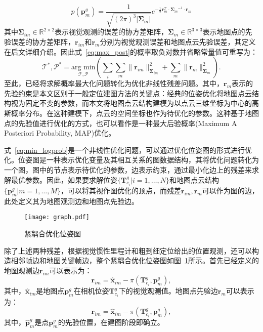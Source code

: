 \begin{equation}
  p(\symbf{p}_m^g) = \frac{1}{\sqrt{(2\pi)^3|\symbf{\Sigma}_m|}}e^{-\frac{1}{2}\symbf{r}_{m}^T \cdot {\symbf{\Sigma}_{m}}^{-1} \cdot \symbf{r}_{m}}
\end{equation}
其中$\symbf{\Sigma}_{im}\in \mathbb{R}^{2\times 2}$表示视觉观测的误差的协方差矩阵，$\symbf{\Sigma}_{m} \in \mathbb{R}^{3 \times 3}$表示地图点的先验误差的协方差矩阵，$\symbf{r}_{im}$和$\symbf{r}_m$分别为视觉观测误差和地图点云先验误差，其定义在后文详细介绍。因此式~\ref{eq:max_post}的概率取负对数并省略常量值可重写为：
\begin{equation}
\label{eq:min_logprob}
\mathcal{T}^*, \mathcal{P}^* = \underset{\mathcal{T}, \mathcal{P}}{\text{arg min}} \left( \sum_i \sum_m \| \symbf{r}_{im} \|_{\symbf{\Sigma}_{im}}^2 + \sum_m \| \symbf{r}_m \|_{\symbf{\Sigma}_{m}}^2 \right).
\end{equation}
至此，已经将求解概率最大化问题转化为优化非线性残差问题。其中，$\symbf{r}_{m}$表示的先验约束是本文区别于一般定位建图方法的关键点：经典的位姿优化将地图点云结构视为固定不变的参数，而本文将地图点云结构建模为以点云三维坐标为中心的高斯概率分布。在这种建模下，点云的空间坐标也作为待优化的参数。这种基于地图点的先验值进行优化的方式，也可以看作是一种最大后验概率(Maximum A Posteriori Probability, MAP)优化。

式~\ref{eq:min_logprob}是一个非线性优化问题，可以通过优化位姿图的形式进行优化。位姿图是一种表示优化变量及其相互关系的图数据结构，其将优化问题转化为一个图，图中的节点表示待优化的参数，边表示约束，通过最小化边上的残差来求解最优参数。因此，如果要求解位姿$\{ \symbf{T}_{c_i}^g | i=1,\dots, N\}$和地图点云结构$\{\symbf{p}^g_m | m = 1, \dots, M\}$，可以将其视作图优化的顶点，而残差$\symbf{r}_{im}, \symbf{r}_m$可以作为图的边，此处定义其为地图观测边和地图点先验边。

\begin{figure}
  \centering
  \texttt{[image: graph.pdf]}
  \caption{紧耦合优化位姿图}
  \label{fig:graph}
\end{figure}

除了上述两种残差，根据视觉惯性里程计和粗到细定位给出的位置观测，还可以构造相邻帧边和地图关键帧边，整个紧耦合优化位姿图如图~\ref{fig:graph}所示。首先已经定义的地图观测边$\symbf{r}_{im}$可以表示为：
\begin{equation}
  \symbf{r}_{im} = \hat{\symbf{x}}_{im} - \pi(\symbf{T}_{c_{i}}^g, \symbf{p}^g_m),
\end{equation}
其中，$\hat{\symbf{x}}_{im}$是地图点$\symbf{p}^g_m$在相机位姿$\symbf{T}_{c_{i}}^g$下的视觉观测值。地图点先验边$\symbf{r}_m$可以表示为：
\begin{equation}
  \symbf{r}_{im} = \hat{\symbf{x}}_{im} - \pi(\symbf{T}_{c_{i}}^g, \symbf{p}^g_m),
\end{equation}
其中，$\hat{\symbf{p}}^g_m$是点$\symbf{p}^g_m$的先验位置，在建图阶段即确立。

